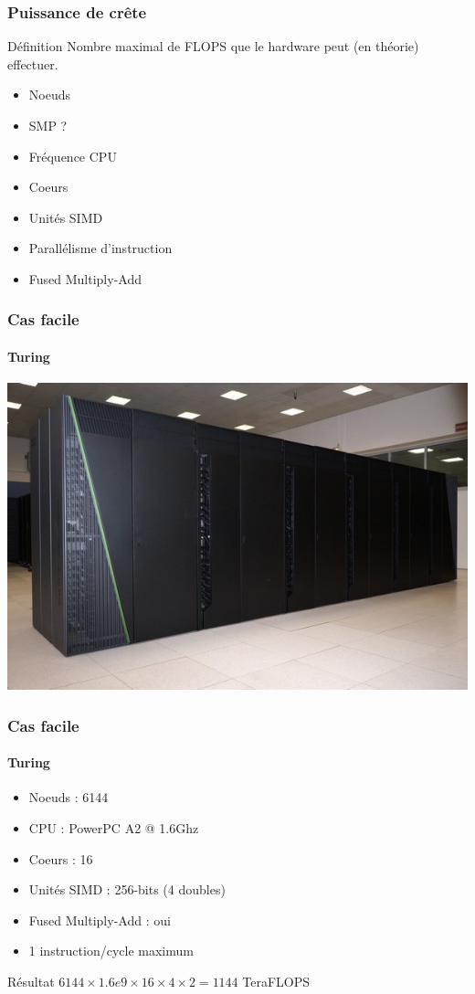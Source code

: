\documentclass[xcolor={x11names,svgnames}, 14pt]{beamer}
\begin{document}
\begin{frame}
  \frametitle{Puissance de crête}

  \begin{block}{Définition}
    Nombre maximal de FLOPS que le hardware peut (en théorie) effectuer.
  \end{block}

  \begin{itemize}
  \item Noeuds
  \item SMP ?
  \item Fréquence CPU
  \item Coeurs
  \item Unités SIMD
  \item Parallélisme d'instruction
  \item Fused Multiply-Add
  \end{itemize}
  
\end{frame}


\begin{frame}
  \frametitle{Cas facile}
  \framesubtitle{Turing}

  \includegraphics[width=\textwidth]{turing}
\end{frame}

\begin{frame}
  \frametitle{Cas facile}
  \framesubtitle{Turing}

  \begin{itemize}
  \item Noeuds : 6144
  \item CPU : PowerPC A2 @ 1.6Ghz
  \item Coeurs : 16
  \item Unités SIMD : 256-bits (4 doubles)
  \item Fused Multiply-Add : oui
  \item 1 instruction/cycle maximum
  \end{itemize}

  \begin{alertblock}{Résultat}
    $6144 \times 1.6e9 \times 16 \times 4 \times 2 = 1144$ TeraFLOPS
  \end{alertblock}
\end{frame}
\end{document}
